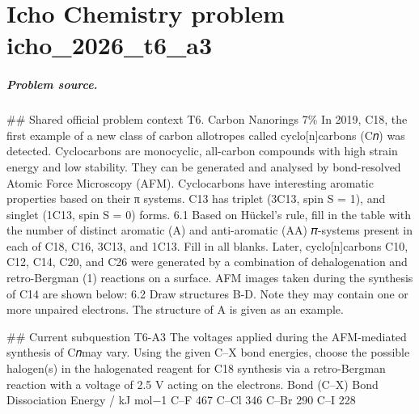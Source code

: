 
\chapter{Icho Chemistry problem icho\_2026\_t6\_a3}
\label{ch:IChO2026Problems_problem_icho_2026_t6_a3}

\paragraph{Problem source.}
\#\# Shared official problem context
T6. Carbon Nanorings 7\% In 2019, C18, the first example of a new class of carbon allotropes called cyclo[n]carbons (C𝑛) was detected. Cyclocarbons are monocyclic, all-carbon compounds with high strain energy and low stability. They can be generated and analysed by bond-resolved Atomic Force Microscopy (AFM). Cyclocarbons have interesting aromatic properties based on their π systems. C13 has triplet (3C13, spin S = 1), and singlet (1C13, spin S = 0) forms. 6.1 Based on Hückel’s rule, fill in the table with the number of distinct aromatic (A) and anti-aromatic (AA) 𝜋-systems present in each of C18, C16, 3C13, and 1C13. Fill in all blanks. Later, cyclo[n]carbons C10, C12, C14, C20, and C26 were generated by a combination of dehalogenation and retro-Bergman (1) reactions on a surface. AFM images taken during the synthesis of C14 are shown below: 6.2 Draw structures B-D. Note they may contain one or more unpaired electrons. The structure of A is given as an example.

\#\# Current subquestion T6-A3
The voltages applied during the AFM-mediated synthesis of C𝑛may vary. Using the given C–X bond energies, choose the possible halogen(s) in the halogenated reagent for C18 synthesis via a retro-Bergman reaction with a voltage of 2.5 V acting on the electrons. Bond (C–X) Bond Dissociation Energy / kJ mol−1 C–F 467 C–Cl 346 C–Br 290 C–I 228


